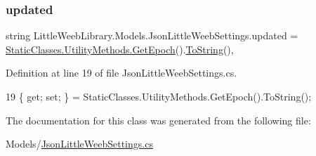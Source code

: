 \subsubsection{\texorpdfstring{updated}{updated}}
{\footnotesize\ttfamily string Little\+Weeb\+Library.\+Models.\+Json\+Little\+Weeb\+Settings.\+updated = \mbox{\hyperlink{class_little_weeb_library_1_1_static_classes_1_1_utility_methods_a12336d9e64983ddabaad8950486fafb2}{Static\+Classes.\+Utility\+Methods.\+Get\+Epoch}}().\mbox{\hyperlink{class_little_weeb_library_1_1_models_1_1_json_little_weeb_settings_a9aca9f5ee262951043ae1fd7d58d3127}{To\+String}}()\hspace{0.3cm}{\ttfamily [get]}, {\ttfamily [set]}}



Definition at line 19 of file Json\+Little\+Weeb\+Settings.\+cs.


\begin{DoxyCode}
19 \{ \textcolor{keyword}{get}; \textcolor{keyword}{set}; \} = StaticClasses.UtilityMethods.GetEpoch().ToString();
\end{DoxyCode}


The documentation for this class was generated from the following file\+:\begin{DoxyCompactItemize}
\item 
Models/\mbox{\hyperlink{_json_little_weeb_settings_8cs}{Json\+Little\+Weeb\+Settings.\+cs}}\end{DoxyCompactItemize}
